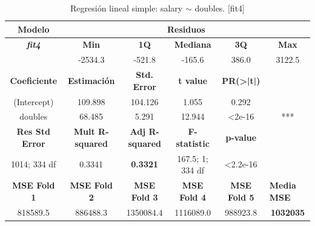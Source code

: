 \documentclass[a4paper,12pt, oneside]{book}
\begin{document}
\begin{table}[H]
\footnotesize
\centering
\begin{tabular}{cccccc}
\hline
\textbf{Modelo} & \multicolumn{5}{c}{\textbf{Residuos}} \\ \hline
\textit{\textbf{fit4}} & \textbf{Min} & \textbf{1Q} & \textbf{Mediana} & \textbf{3Q} & \textbf{Max} \\ \cline{2-6} 
\multicolumn{1}{l}{} & -2534.3 & -521.8 & -165.6 & 386.0 & 3122.5 \\ \cline{1-5}
\textbf{Coeficiente} & \textbf{Estimación} & \textbf{Std. Error} & \textbf{t value} & \textbf{PR(\textgreater{}|t|)} & \multicolumn{1}{l}{} \\ \cline{1-5}
(Intercept) & 109.898 & 104.126 & 1.055 & 0.292 &  \\
doubles & 68.485 & 5.291 & 12.944 & \textless{}2e-16 & *** \\ \cline{1-5}
\textbf{Res Std Error} & \textbf{Mult R-squared} & \textbf{Adj R-squared} & \textbf{F-statistic} & \textbf{p-value} & \multicolumn{1}{l}{} \\ \cline{1-5}
1014; 334 df & 0.3341 & \textbf{0.3321} & 167.5; 1; 334 df & \textless{}2.2e-16 & \multicolumn{1}{l}{} \\ \hline
\textbf{MSE Fold 1} & \textbf{MSE Fold 2} & \textbf{MSE Fold 3} & \textbf{MSE Fold 4} & \textbf{MSE Fold 5} & \multicolumn{1}{l}{\textbf{Media MSE}} \\ \hline
818589.5 & 886488.3 & 1350084.4 & 1116089.0 & 988923.8 & \textbf{1032035}
\end{tabular}
\caption{Regresión lineal simple: salary $\sim$ doubles. {[}fit4{]}}
\label{tab:fit4}
\end{table}
\end{document}
